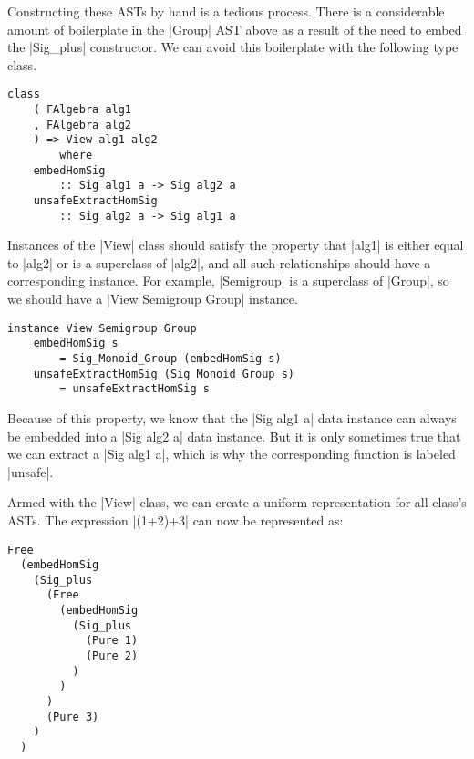 \documentclass[preprint]{sigplanconf}
\theoremstyle{definition}
\begin{document}
Constructing these ASTs by hand is a tedious process.
There is a considerable amount of boilerplate in the |Group| AST above as a result of the need to embed the |Sig_plus| constructor.
We can avoid this boilerplate with the following type class.
\begin{lstlisting}
class
    ( FAlgebra alg1
    , FAlgebra alg2
    ) => View alg1 alg2
        where
    embedHomSig
        :: Sig alg1 a -> Sig alg2 a
    unsafeExtractHomSig
        :: Sig alg2 a -> Sig alg1 a
\end{lstlisting}
Instances of the |View| class should satisfy the property that |alg1| is either equal to |alg2| or is a superclass of |alg2|, and
all such relationships should have a corresponding instance.
For example, |Semigroup| is a superclass of |Group|,
so we should have a |View Semigroup Group| instance.
\begin{lstlisting}
instance View Semigroup Group
    embedHomSig s
        = Sig_Monoid_Group (embedHomSig s)
    unsafeExtractHomSig (Sig_Monoid_Group s)
        = unsafeExtractHomSig s
\end{lstlisting}
Because of this property, we know that the |Sig alg1 a| data instance can always be embedded into a |Sig alg2 a| data instance.
But it is only sometimes true that we can extract a |Sig alg1 a|,
which is why the corresponding function is labeled |unsafe|.

Armed with the |View| class, we can create a uniform representation for all class's ASTs.
The expression |(1+2)+3| can now be represented as:
\begin{lstlisting}
Free
  (embedHomSig
    (Sig_plus
      (Free
        (embedHomSig
          (Sig_plus
            (Pure 1)
            (Pure 2)
          )
        )
      )
      (Pure 3)
    )
  )
\end{lstlisting}



\end{document}
